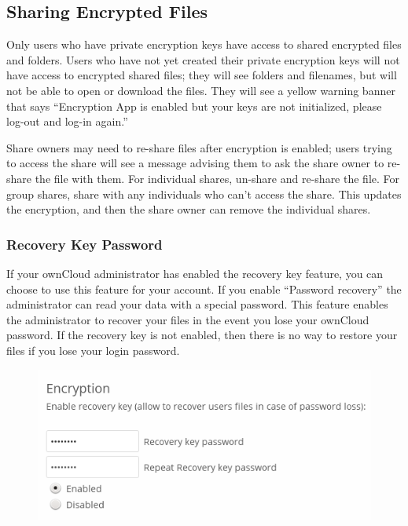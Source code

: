 \documentclass[letterpaper,10pt,english]{sphinxmanual}
\begin{document}
\subsection{Sharing Encrypted Files}
\label{files/encrypting_files:sharing-encrypted-files}
Only users who have private encryption keys have access to shared encrypted
files and folders. Users who have not yet created their private encryption keys
will not have access to encrypted shared files; they will see folders and
filenames, but will not be able to open or download the files. They will see a
yellow warning banner that says ``Encryption App is enabled but your keys are not
initialized, please log-out and log-in again.''

Share owners may need to re-share files after encryption is enabled; users
trying to access the share will see a message advising them to ask the share
owner to re-share the file with them. For individual shares, un-share and
re-share the file. For group shares, share with any individuals who can't access
the share. This updates the encryption, and then the share owner can remove the
individual shares.


\subsubsection{Recovery Key Password}
\label{files/encrypting_files:recovery-key-password}
If your ownCloud administrator has enabled the recovery key feature, you can
choose to use this feature for your account. If you enable ``Password recovery''
the administrator can read your data with a special password. This feature
enables the administrator to recover your files in the event you lose your
ownCloud password. If the recovery key is not enabled, then there is no way to
restore your files if you lose your login password.
\begin{figure}[htbp]
\centering

\includegraphics{encryption3.png}
\end{figure}
\end{document}
